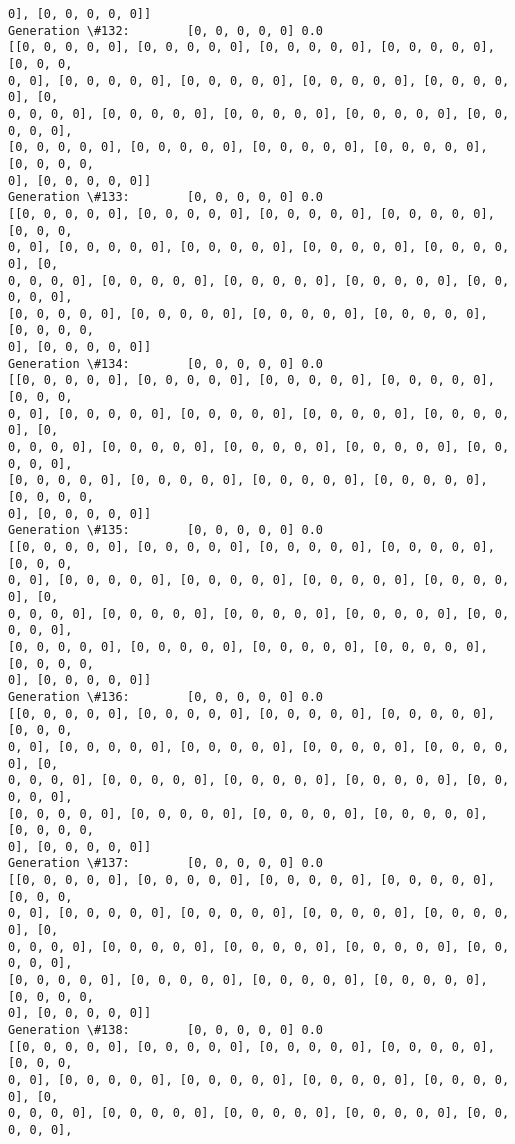 \documentclass[11pt]{article}
\begin{document}
\begin{Verbatim}[commandchars=\\\{\}]
0], [0, 0, 0, 0, 0]]
Generation \#132:        [0, 0, 0, 0, 0] 0.0
[[0, 0, 0, 0, 0], [0, 0, 0, 0, 0], [0, 0, 0, 0, 0], [0, 0, 0, 0, 0], [0, 0, 0,
0, 0], [0, 0, 0, 0, 0], [0, 0, 0, 0, 0], [0, 0, 0, 0, 0], [0, 0, 0, 0, 0], [0,
0, 0, 0, 0], [0, 0, 0, 0, 0], [0, 0, 0, 0, 0], [0, 0, 0, 0, 0], [0, 0, 0, 0, 0],
[0, 0, 0, 0, 0], [0, 0, 0, 0, 0], [0, 0, 0, 0, 0], [0, 0, 0, 0, 0], [0, 0, 0, 0,
0], [0, 0, 0, 0, 0]]
Generation \#133:        [0, 0, 0, 0, 0] 0.0
[[0, 0, 0, 0, 0], [0, 0, 0, 0, 0], [0, 0, 0, 0, 0], [0, 0, 0, 0, 0], [0, 0, 0,
0, 0], [0, 0, 0, 0, 0], [0, 0, 0, 0, 0], [0, 0, 0, 0, 0], [0, 0, 0, 0, 0], [0,
0, 0, 0, 0], [0, 0, 0, 0, 0], [0, 0, 0, 0, 0], [0, 0, 0, 0, 0], [0, 0, 0, 0, 0],
[0, 0, 0, 0, 0], [0, 0, 0, 0, 0], [0, 0, 0, 0, 0], [0, 0, 0, 0, 0], [0, 0, 0, 0,
0], [0, 0, 0, 0, 0]]
Generation \#134:        [0, 0, 0, 0, 0] 0.0
[[0, 0, 0, 0, 0], [0, 0, 0, 0, 0], [0, 0, 0, 0, 0], [0, 0, 0, 0, 0], [0, 0, 0,
0, 0], [0, 0, 0, 0, 0], [0, 0, 0, 0, 0], [0, 0, 0, 0, 0], [0, 0, 0, 0, 0], [0,
0, 0, 0, 0], [0, 0, 0, 0, 0], [0, 0, 0, 0, 0], [0, 0, 0, 0, 0], [0, 0, 0, 0, 0],
[0, 0, 0, 0, 0], [0, 0, 0, 0, 0], [0, 0, 0, 0, 0], [0, 0, 0, 0, 0], [0, 0, 0, 0,
0], [0, 0, 0, 0, 0]]
Generation \#135:        [0, 0, 0, 0, 0] 0.0
[[0, 0, 0, 0, 0], [0, 0, 0, 0, 0], [0, 0, 0, 0, 0], [0, 0, 0, 0, 0], [0, 0, 0,
0, 0], [0, 0, 0, 0, 0], [0, 0, 0, 0, 0], [0, 0, 0, 0, 0], [0, 0, 0, 0, 0], [0,
0, 0, 0, 0], [0, 0, 0, 0, 0], [0, 0, 0, 0, 0], [0, 0, 0, 0, 0], [0, 0, 0, 0, 0],
[0, 0, 0, 0, 0], [0, 0, 0, 0, 0], [0, 0, 0, 0, 0], [0, 0, 0, 0, 0], [0, 0, 0, 0,
0], [0, 0, 0, 0, 0]]
Generation \#136:        [0, 0, 0, 0, 0] 0.0
[[0, 0, 0, 0, 0], [0, 0, 0, 0, 0], [0, 0, 0, 0, 0], [0, 0, 0, 0, 0], [0, 0, 0,
0, 0], [0, 0, 0, 0, 0], [0, 0, 0, 0, 0], [0, 0, 0, 0, 0], [0, 0, 0, 0, 0], [0,
0, 0, 0, 0], [0, 0, 0, 0, 0], [0, 0, 0, 0, 0], [0, 0, 0, 0, 0], [0, 0, 0, 0, 0],
[0, 0, 0, 0, 0], [0, 0, 0, 0, 0], [0, 0, 0, 0, 0], [0, 0, 0, 0, 0], [0, 0, 0, 0,
0], [0, 0, 0, 0, 0]]
Generation \#137:        [0, 0, 0, 0, 0] 0.0
[[0, 0, 0, 0, 0], [0, 0, 0, 0, 0], [0, 0, 0, 0, 0], [0, 0, 0, 0, 0], [0, 0, 0,
0, 0], [0, 0, 0, 0, 0], [0, 0, 0, 0, 0], [0, 0, 0, 0, 0], [0, 0, 0, 0, 0], [0,
0, 0, 0, 0], [0, 0, 0, 0, 0], [0, 0, 0, 0, 0], [0, 0, 0, 0, 0], [0, 0, 0, 0, 0],
[0, 0, 0, 0, 0], [0, 0, 0, 0, 0], [0, 0, 0, 0, 0], [0, 0, 0, 0, 0], [0, 0, 0, 0,
0], [0, 0, 0, 0, 0]]
Generation \#138:        [0, 0, 0, 0, 0] 0.0
[[0, 0, 0, 0, 0], [0, 0, 0, 0, 0], [0, 0, 0, 0, 0], [0, 0, 0, 0, 0], [0, 0, 0,
0, 0], [0, 0, 0, 0, 0], [0, 0, 0, 0, 0], [0, 0, 0, 0, 0], [0, 0, 0, 0, 0], [0,
0, 0, 0, 0], [0, 0, 0, 0, 0], [0, 0, 0, 0, 0], [0, 0, 0, 0, 0], [0, 0, 0, 0, 0],

\end{Verbatim}
\end{document}
